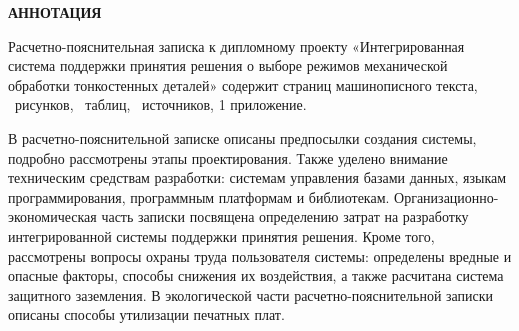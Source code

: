 \documentclass[14pt,oneside,final]{extreport}
\begin{document}
 	\begin{titlepage}
 		\begin{center}
 			\textbf{АННОТАЦИЯ}
 		\end{center}
 		
	Расчетно-пояснительная записка к дипломному проекту «Интегрированная система поддержки принятия решения о выборе режимов механической обработки тонкостенных деталей» содержит \pageref{LastPage} страниц машинописного текста, \totalfigures\ рисунков, \totaltables\ таблиц,  	\ источников, 1 приложение.
	
	В расчетно-пояснительной записке описаны предпосылки создания системы, подробно рассмотрены этапы проектирования. Также уделено внимание техническим средствам разработки: системам управления базами данных, языкам программирования, программным платформам и библиотекам. Организационно-экономическая часть записки посвящена определению затрат на разработку интегрированной системы поддержки принятия решения. Кроме того, рассмотрены вопросы охраны труда пользователя системы: определены вредные и опасные факторы, способы снижения их воздействия, а также расчитана система защитного заземления. В экологической части расчетно-пояснительной записки описаны способы утилизации печатных плат.

	\thispagestyle{empty}
 	\end{titlepage}
 
\end{document}

